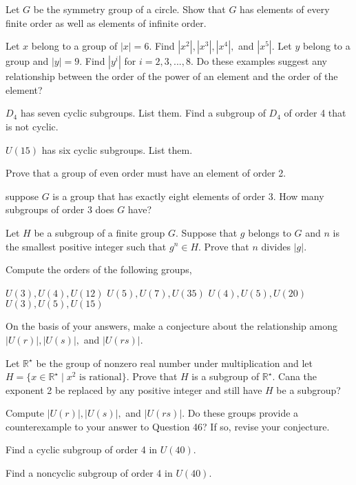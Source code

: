 \documentclass[11pt,largemargins]{homework}
\begin{document}
\question
Let $G$ be the symmetry group of a circle. Show that $G$ has elements of every finite order as well as 
elements of infinite order.

\question
Let $x$ belong to a group of $|x|=6$. Find $|x^2|,|x^3|,|x^4|,$ and $|x^5|$. Let $y$ belong to a group 
and $|y|=9$. Find $|y^i|$ for $i=2,3,...,8$. Do these examples suggest any relationship between the order of the power 
of an element and the order of the element?

\question
$D_4$ has seven cyclic subgroups. List them. Find a subgroup of $D_4$ of order 4 that is not cyclic.

\question
$U(15)$ has six cyclic subgroups. List them.

\question
Prove that a group of even order must have an element of order 2.

\question
suppose $G$ is a group that has exactly eight elements of order 3. How many subgroups of order 3 does $G$ have?

\question
Let $H$ be a subgroup of a finite group $G$. Suppose that $g$ belongs to $G$ and $n$ is the smallest positive integer 
such that $g^n\in H$. Prove that $n$ divides $|g|$.

\question
Compute the orders of the following groups,
\begin{alphaparts}
    \questionpart
    $U(3),U(4),U(12)$
    \questionpart
    $U(5),U(7),U(35)$
    \questionpart
    $U(4),U(5),U(20)$
    \questionpart
    $U(3),U(5),U(15)$
\end{alphaparts}
On the basis of your answers, make a conjecture about the relationship among $|U(r)|,|U(s)|,$ and $|U(rs)|$.

\question
Let $\mathbb{R}^\star$ be the group of nonzero real number under multiplication and let 
$H=\{x\in\mathbb{R}^\star \;|\;x^2 \text{ is rational}\}$. Prove that $H$ is a subgroup of $\mathbb{R}^\star$.
Cana the exponent 2 be replaced by any positive integer and still have $H$ be a subgroup?

\question
Compute $|U(r)|,|U(s)|,$ and $|U(rs)|$. Do these groups provide a counterexample to your answer to Question 46?
If so, revise your conjecture.

\question
Find a cyclic subgroup of order 4 in $U(40)$.

\question
Find a noncyclic subgroup of order 4 in $U(40)$.
\end{document}
